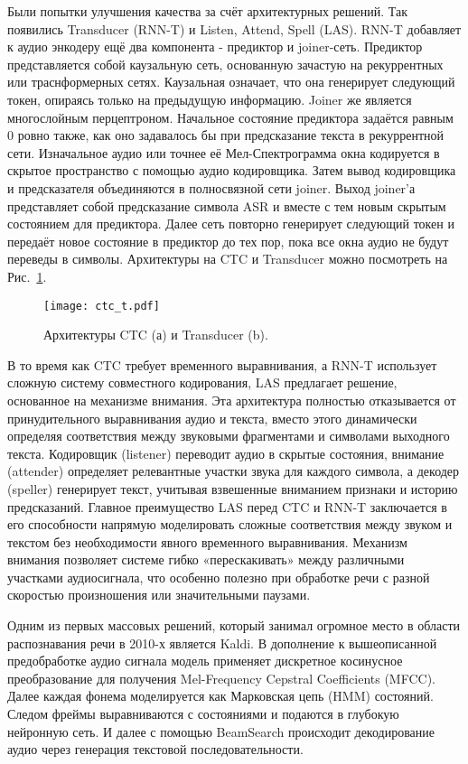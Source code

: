 Были попытки улучшения качества за счёт архитектурных решений.
Так появились Transducer (RNN-T) и Listen, Attend, Spell (LAS).
RNN-T добавляет к аудио энкодеру ещё два компонента - предиктор и joiner-сеть.
Предиктор представляется собой каузальную сеть, основанную зачастую на рекуррентных или траснформерных сетях.
Каузальная означает, что она генерирует следующий токен, опираясь только на предыдущую информацию.
Joiner же является многослойным перцептроном.
Начальное состояние предиктора задаётся равным 0 ровно также, как оно задавалось бы при предсказание текста в рекуррентной сети.
Изначальное аудио или точнее её Мел-Спектрограмма окна кодируется в скрытое пространство с помощью аудио кодировщика.
Затем вывод кодировщика и предсказателя объединяются в полносвязной сети joiner.
Выход joiner'а представляет собой предсказание символа ASR и вместе с тем новым скрытым состоянием для предиктора.
Далее сеть повторно генерирует следующий токен и передаёт новое состояние в предиктор до тех пор, пока все окна аудио не будут переведы в символы.
Архитектуры на CTC и Transducer можно посмотреть на Рис.~\ref{fig:ctc_t}.

\begin{figure}[!t]
  \centering
  \texttt{[image: ctc\_t.pdf]}
  \caption{Архитектуры CTC (а) и Transducer (b).}
  \label{fig:ctc_t}
\end{figure}

В то время как CTC требует временного выравнивания, а RNN-T использует сложную систему совместного кодирования, LAS предлагает решение, основанное на механизме внимания.
Эта архитектура полностью отказывается от принудительного выравнивания аудио и текста, вместо этого динамически определяя соответствия между звуковыми фрагментами и символами выходного текста.
Кодировщик (listener) переводит аудио в скрытые состояния, внимание (attender) определяет релевантные участки звука для каждого символа, а декодер (speller) генерирует текст, учитывая взвешенные вниманием признаки и историю предсказаний.
Главное преимущество LAS перед CTC и RNN-T заключается в его способности напрямую моделировать сложные соответствия между звуком и текстом без необходимости явного временного выравнивания.
Механизм внимания позволяет системе гибко «перескакивать» между различными участками аудиосигнала, что особенно полезно при обработке речи с разной скоростью произношения или значительными паузами.

Одним из первых массовых решений, который занимал огромное место в области распознавания речи в 2010-х является Kaldi.
В дополнение к вышеописанной предобработке аудио сигнала модель применяет дискретное косинусное преобразование для получения Mel-Frequency Cepstral Coefficients (MFCC).
Далее каждая фонема моделируется как Марковская цепь (HMM) состояний.
Следом фреймы выравниваются с состояниями и подаются в глубокую нейронную сеть.
И далее с помощью BeamSearch происходит декодирование аудио через генерация текстовой последовательности.

